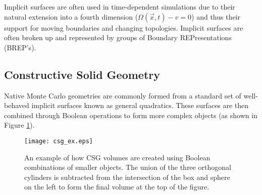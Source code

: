 Implicit surfaces are often used in time-dependent simulations due to their
natural extension into a fourth dimension ($ \Omega(\vec{x},t) - v  = 0 $) and
thus their support for moving boundaries and changing topologies. Implicit
surfaces are often broken up and represented by groups of Boundary
REPresentations (BREP's). 

\subsection{Constructive Solid Geometry}\label{subsec:csg}

Native Monte Carlo geometries are commonly formed from a standard set of
well-behaved implicit surfaces known as general quadratics. These surfaces are
then combined through Boolean operations to form more complex objects (as shown
in Figure \ref{fig:csg_ex}).

\begin{figure}[h]
  \centering
  \texttt{[image: csg\_ex.eps]}
  \caption{An example of how CSG volumes are created using Boolean combinations
    of smaller objects. The union of the three orthogonal cylinders is
    subtracted from the intersection of the box and sphere on the left to form
    the final volume at the top of the figure.}
  \label{fig:csg_ex}
\end{figure}



